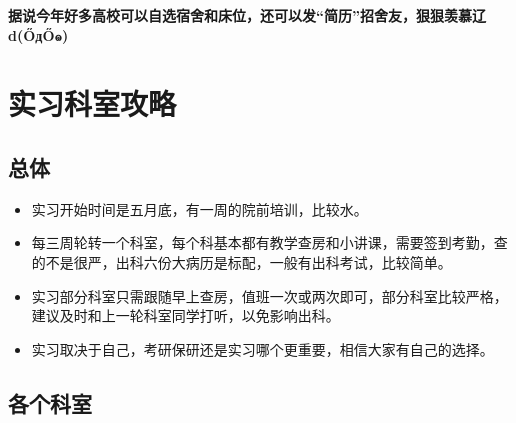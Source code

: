 \documentclass[zihao=-4,fontset=none]{Beautybook-CN}
\begin{document}
\textbf{据说今年好多高校可以自选宿舍和床位，还可以发“简历”招舍友，狠狠羡慕辽d({\H{O}}д{\H{O}}๑)}
\section{实习科室攻略}

\subsection{总体}


\begin{itemize}
\item 实习开始时间是五月底，有一周的院前培训，比较水。
\item 每三周轮转一个科室，每个科基本都有教学查房和小讲课，需要签到考勤，查的不是很严，出科六份大病历是标配，一般有出科考试，比较简单。
\item 实习部分科室只需跟随早上查房，值班一次或两次即可，部分科室比较严格，建议及时和上一轮科室同学打听，以免影响出科。
\item 实习取决于自己，考研保研还是实习哪个更重要，相信大家有自己的选择。
\end{itemize}
\subsection{各个科室}
\end{document}
